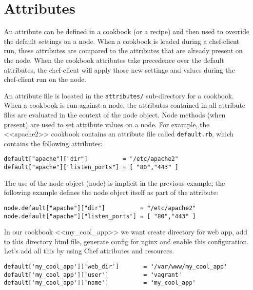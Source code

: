 \section{Attributes}
\label{sec:cookbook-attributes}

An attribute can be defined in a cookbook (or a recipe) and then used to override the default settings on a node. When a cookbook is loaded during a chef-client run, these attributes are compared to the attributes that are already present on the node. When the cookbook attributes take precedence over the default attributes, the chef-client will apply those new settings and values during the chef-client run on the node.

An attribute file is located in the \lstinline!attributes/! sub-directory for a cookbook. When a cookbook is run against a node, the attributes contained in all attribute files are evaluated in the context of the node object. Node methods (when present) are used to set attribute values on a node. For example, the <<apache2>> cookbook contains an attribute file called \lstinline!default.rb!, which contains the following attributes:

\begin{lstlisting}[label=lst:cookbook-attributes1]
default["apache"]["dir"]          = "/etc/apache2"
default["apache"]["listen_ports"] = [ "80","443" ]
\end{lstlisting}

The use of the node object (node) is implicit in the previous example; the following example defines the node object itself as part of the attribute:

\begin{lstlisting}[label=lst:cookbook-attributes2]
node.default["apache"]["dir"]          = "/etc/apache2"
node.default["apache"]["listen_ports"] = [ "80","443" ]
\end{lstlisting}

In our cookbook <<my\_cool\_app>> we want create directory for web app, add to this directory html file, generate config for nginx and enable this configuration. Let's add all this by using Chef attributes and resources.

\begin{lstlisting}[label=lst:cookbook-attributes3,title=my-server-cloud/site-cookbooks/my\_cool\_app/attributes/default.rb]
default['my_cool_app']['web_dir']       = '/var/www/my_cool_app'
default['my_cool_app']['user']          = 'vagrant'
default['my_cool_app']['name']          = 'my_cool_app'
\end{lstlisting}

